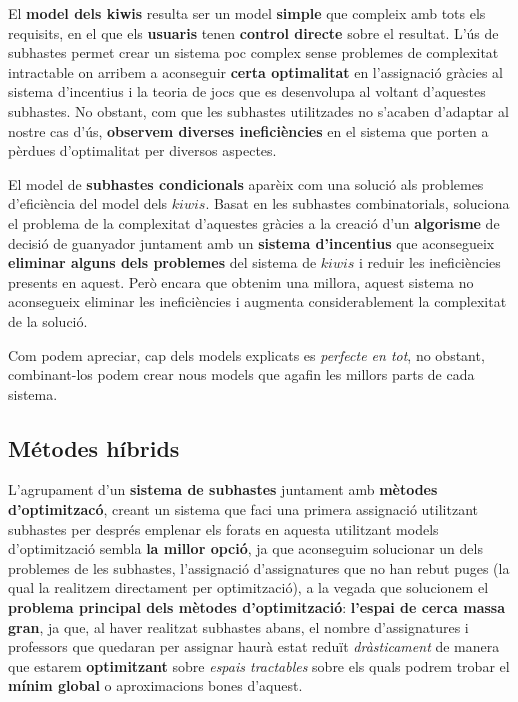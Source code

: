 \documentclass[10pt,twocolumn]{article}
\begin{document}
	El \textbf{model dels kiwis} resulta ser un model \textbf{simple} que compleix amb tots els requisits, en el que els \textbf{usuaris} tenen \textbf{control directe} sobre el resultat. L'ús de subhastes permet crear un sistema poc complex sense problemes de complexitat intractable on arribem a aconseguir \textbf{certa optimalitat} en l'assignació gràcies al sistema d'incentius i la teoria de jocs que es desenvolupa al voltant d'aquestes subhastes. No obstant, com que les subhastes utilitzades no s'acaben d'adaptar al nostre cas d'ús, \textbf{observem diverses ineficiències} en el sistema que porten a pèrdues d'optimalitat per diversos aspectes.
	
	El model de \textbf{subhastes condicionals} aparèix com una solució als problemes d'eficiència del model dels $kiwis$. Basat en les subhastes combinatorials, soluciona el problema de la complexitat d'aquestes gràcies  a la creació d'un \textbf{algorisme} de decisió de guanyador juntament amb un \textbf{sistema d'incentius} que aconsegueix \textbf{eliminar alguns dels problemes} del sistema de $kiwis$ i reduir les ineficiències presents en aquest. Però encara que obtenim una millora, aquest sistema no aconsegueix eliminar les ineficiències i augmenta considerablement la complexitat de la solució.
	
	Com podem apreciar, cap dels models explicats es \textit{perfecte en tot}, no obstant, combinant-los podem crear nous models que agafin les millors parts de cada sistema.
	
	\subsection{Métodes híbrids}
	L'agrupament d'un \textbf{sistema de subhastes} juntament amb \textbf{mètodes d'optimitzacó}, creant un sistema que faci una primera assignació utilitzant subhastes per després emplenar els forats en aquesta utilitzant models d'optimització sembla \textbf{la millor opció}, ja que aconseguim solucionar un dels problemes de les subhastes, l'assignació d'assignatures que no han rebut puges (la qual la realitzem directament per optimització), a la vegada que solucionem el \textbf{problema principal dels mètodes d'optimització}: \textbf{l'espai de cerca massa gran}, ja que, al haver realitzat subhastes abans, el nombre d'assignatures i professors que quedaran per assignar haurà estat reduït \textit{dràsticament} de manera que estarem \textbf{optimitzant} sobre \textit{espais tractables} sobre els quals podrem trobar el \textbf{mínim global} o aproximacions bones d'aquest.
	
\end{document}
